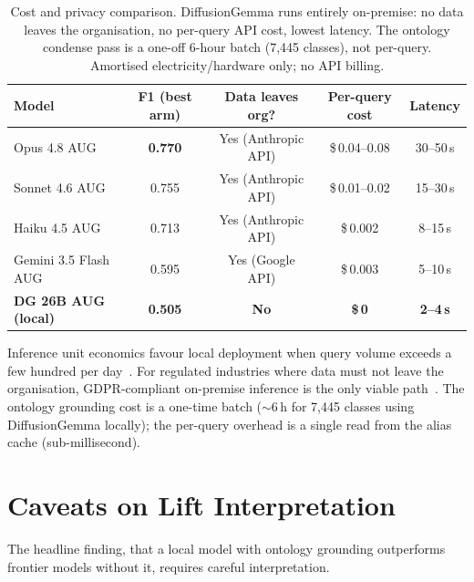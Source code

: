 \documentclass[11pt]{article}
\begin{document}
\begin{samepage}
\begin{table}[h]\centering\small
\begin{tabular}{lcccc}
\toprule
Model & F1 (best arm) & Data leaves org? & Per-query cost & Latency \\
\midrule
Opus 4.8 AUG & \textbf{0.770} & Yes (Anthropic API) & \$\,0.04--0.08 & 30--50\,s \\
Sonnet 4.6 AUG & 0.755 & Yes (Anthropic API) & \$\,0.01--0.02 & 15--30\,s \\
Haiku 4.5 AUG & 0.713 & Yes (Anthropic API) & \$\,0.002 & 8--15\,s \\
Gemini 3.5 Flash AUG & 0.595 & Yes (Google API) & \$\,0.003 & 5--10\,s \\
\midrule
\textbf{DG 26B AUG (local)} & \textbf{0.505} & \textbf{No} & \textbf{\$\,0\rlap{*}} & \textbf{2--4\,s} \\
\bottomrule
\end{tabular}
\caption{Cost and privacy comparison. DiffusionGemma runs entirely on-premise: no data leaves
the organisation, no per-query API cost, lowest latency. The ontology condense pass is a one-off
6-hour batch (7{,}445 classes), not per-query.\\
{\footnotesize *Amortised electricity/hardware only; no API billing.}}
\end{table}
\end{samepage}

Inference unit economics favour local deployment when query volume exceeds a few hundred
per day~\cite{introl2026inference}. For regulated industries where data must not leave the
organisation, GDPR-compliant on-premise inference is the only viable
path~\cite{advisori2026gdpr}. The ontology grounding cost is a one-time batch
($\sim$6\,h for 7{,}445 classes using DiffusionGemma locally); the per-query overhead is a
single read from the alias cache (sub-millisecond).

\section{Caveats on Lift Interpretation}
\label{sec:caveats}

The headline finding, that a local model with ontology grounding outperforms frontier models
without it, requires careful interpretation.
\end{document}
